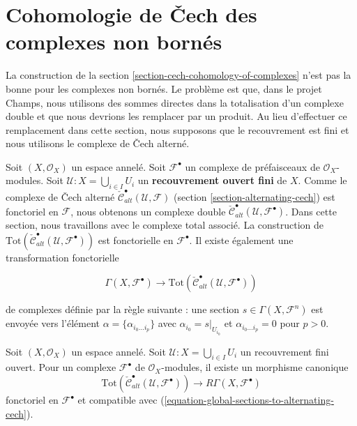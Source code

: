 \section{Cohomologie de {\v C}ech des complexes non bornés}

\label{section-cech-cohomology-of-unbounded-complexes}

\noindent
La construction de la section \ref{section-cech-cohomology-of-complexes} n'est pas la bonne pour les complexes non bornés. Le problème est que, dans le projet Champs, nous utilisons des sommes directes dans la totalisation d'un complexe double et que nous devrions les remplacer par un produit. Au lieu d'effectuer ce remplacement dans cette section, nous supposons que le recouvrement est fini et nous utilisons le complexe de {\v C}ech alterné.

\medskip\noindent

Soit $(X, \mathcal{O}_X)$ un espace annelé. Soit ${\mathcal F}^\bullet$ un complexe de préfaisceaux de
$\mathcal{O}_X$-modules. Soit ${\mathcal U} : X = \bigcup_{i \in I} U_i$
un {\bf recouvrement ouvert fini} de $X$. Comme le complexe de {\v C}ech alterné
$\check{\mathcal{C}}_{alt}^\bullet(\mathcal{U}, \mathcal{F})$
(section \ref{section-alternating-cech}) est fonctoriel en $\mathcal{F}$, nous obtenons un complexe double
$\check{\mathcal{C}}^\bullet_{alt}(\mathcal{U}, \mathcal{F}^\bullet)$. Dans cette section, nous travaillons avec le complexe total associé.
La construction de $\text{Tot}(\check{\mathcal{C}}^\bullet_{alt}({\mathcal U},
{\mathcal F}^\bullet))$
est fonctorielle en ${\mathcal F}^\bullet$. Il existe également une transformation fonctorielle

\begin{equation}
\label{equation-global-sections-to-alternating-cech}
\Gamma(X, {\mathcal F}^\bullet)
\longrightarrow
\text{Tot}(\check{\mathcal{C}}^\bullet_{alt}({\mathcal U},
{\mathcal F}^\bullet))
\end{equation}

de complexes définie par la règle suivante : une section
$s\in \Gamma(X, {\mathcal F}^n)$
est envoyée vers l'élément $\alpha = \{\alpha_{i_0\ldots i_p}\}$
avec $\alpha_{i_0} = s|_{U_{i_0}}$ et $\alpha_{i_0\ldots i_p} = 0$
pour $p > 0$.

\begin{lemma}

\label{lemma-alternating-cech-complex-complex}

Soit $(X, \mathcal{O}_X)$ un espace annelé. Soit $\mathcal{U} : X = \bigcup_{i \in I} U_i$ un recouvrement fini ouvert. Pour un complexe $\mathcal{F}^\bullet$
de $\mathcal{O}_X$-modules, il existe un morphisme canonique
$$
\text{Tot}(\check{\mathcal{C}}^\bullet_{alt}(\mathcal{U}, \mathcal{F}^\bullet))
\longrightarrow
R\Gamma(X, \mathcal{F}^\bullet)
$$
fonctoriel en $\mathcal{F}^\bullet$ et compatible avec (\ref{equation-global-sections-to-alternating-cech}).

\end{lemma}

